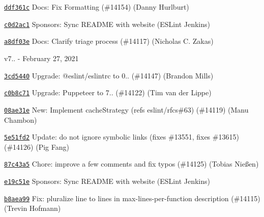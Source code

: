 \begin{DoxyItemize}
\item \href{https://github.com/eslint/eslint/commit/ddf361ca2a2a01a9974f421e5f62270df282d0e8}{\texttt{ {\ttfamily ddf361c}}} Docs\+: Fix Formatting (\#14154) (Danny Hurlburt)
\item \href{https://github.com/eslint/eslint/commit/c0d2ac16f8f9c75c62c78e9fe6a24a25ba0d7828}{\texttt{ {\ttfamily c0d2ac1}}} Sponsors\+: Sync README with website (ESLint Jenkins)
\item \href{https://github.com/eslint/eslint/commit/a8df03efe3bc47665d2112c2cdd5bead337d475d}{\texttt{ {\ttfamily a8df03e}}} Docs\+: Clarify triage process (\#14117) (Nicholas C. Zakas)
\end{DoxyItemize}

v7.. -\/ February 27, 2021


\begin{DoxyItemize}
\item \href{https://github.com/eslint/eslint/commit/3cd5440b94d5fa4f11a09f50b685f6150f0c2d41}{\texttt{ {\ttfamily 3cd5440}}} Upgrade\+: @eslint/eslintrc to 0.. (\#14147) (Brandon Mills)
\item \href{https://github.com/eslint/eslint/commit/c0b8c71df4d0b3f54b20587432d9133741985d5c}{\texttt{ {\ttfamily c0b8c71}}} Upgrade\+: Puppeteer to 7.. (\#14122) (Tim van der Lippe)
\item \href{https://github.com/eslint/eslint/commit/08ae31e539e381cd0eabf6393fa5c20f1d59125f}{\texttt{ {\ttfamily 08ae31e}}} New\+: Implement cache\+Strategy (refs eslint/rfcs\#63) (\#14119) (Manu Chambon)
\item \href{https://github.com/eslint/eslint/commit/5e51fd28dc773c11c924450d24088f97f2824f00}{\texttt{ {\ttfamily 5e51fd2}}} Update\+: do not ignore symbolic links (fixes \#13551, fixes \#13615) (\#14126) (Pig Fang)
\item \href{https://github.com/eslint/eslint/commit/87c43a5d7ea2018cffd6d9b5c431ecb60caaf0d6}{\texttt{ {\ttfamily 87c43a5}}} Chore\+: improve a few comments and fix typos (\#14125) (Tobias Nießen)
\item \href{https://github.com/eslint/eslint/commit/e19c51ea2ef2cf666d94218c66f6b223bb2e9dae}{\texttt{ {\ttfamily e19c51e}}} Sponsors\+: Sync README with website (ESLint Jenkins)
\item \href{https://github.com/eslint/eslint/commit/b8aea9988b6451b6a05af4f3ede8d6ed5c1d9926}{\texttt{ {\ttfamily b8aea99}}} Fix\+: pluralize \textquotesingle{}line\textquotesingle{} to \textquotesingle{}lines\textquotesingle{} in max-\/lines-\/per-\/function description (\#14115) (Trevin Hofmann)

\end{DoxyItemize}
